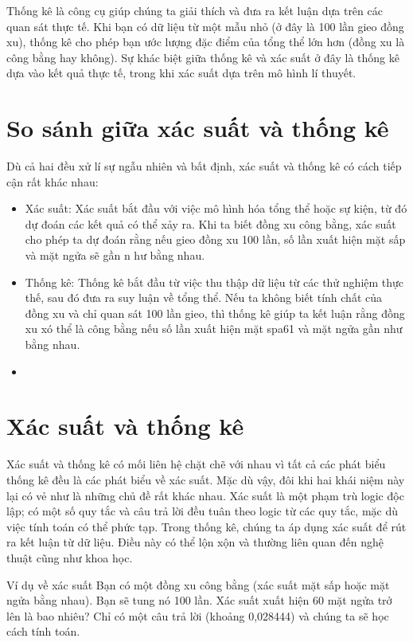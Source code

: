 \documentclass[12pt]{article} %
\begin{document}
Thống kê là công cụ giúp chúng ta giải thích và đưa ra kết luận dựa trên các quan sát thực tế. Khi bạn có dữ liệu từ một mẫu nhỏ (ở đây là 100 lần gieo đồng xu), thống kê cho phép bạn ước lượng đặc điểm của tổng thể lớn hơn (đồng xu là công bằng hay không). Sự khác biệt giữa thống kê và xác suất ở đây là thống kê dựa vào kết quả thực tế, trong khi xác suất dựa trên mô hình lí thuyết.

\section{So sánh giữa xác suất và thống kê}
Dù cả hai đều xử lí sự ngẫu nhiên và bất định, xác suất và thống kê có cách tiếp cận rất khác nhau:
\begin{itemize}
    \item Xác suất: Xác suất bắt đầu với việc mô hình hóa tổng thể hoặc sự kiện, từ đó dự đoán các kết quả có thể xảy ra. Khi ta biết đồng xu công bằng, xác suất cho phép ta dự đoán rằng nếu gieo đồng xu 100 lần, số lần xuất hiện mặt sấp và mặt ngửa sẽ gần n hư bằng nhau.
    \item Thống kê: Thống kê bắt đầu từ việc thu thập dữ liệu từ các thử nghiệm thực thế, sau đó đưa ra suy luận về tổng thể. Nếu ta không biết tính chất của đồng xu và chỉ quan sát 100 lần gieo, thì thống kê giúp ta kết luận rằng đồng xu xó thể là công bằng nếu số lần xuất hiện mặt spa61 và mặt ngửa gần như bằng nhau.
    \item 
\end{itemize}

\section{Xác suất và thống kê}
Xác suất và thống kê có mối liên hệ chặt chẽ với nhau vì tất cả các phát biểu thống kê đều là các phát biểu về xác suất. Mặc dù vậy, đôi khi hai khái niệm này lại có vẻ như là những chủ đề rất khác nhau. Xác suất là một phạm trù logic độc lập; có một số quy tắc và câu trả lời đều tuân theo logic từ các quy tắc, mặc dù việc tính toán có thể phức tạp. Trong thống kê, chúng ta áp dụng xác suất để rút ra kết luận từ dữ liệu. Điều này có thể lộn xộn và thường liên quan đến nghệ thuật cũng như khoa học.

Ví dụ về xác suất
Bạn có một đồng xu công bằng (xác suất mặt sấp hoặc mặt ngửa bằng nhau). Bạn sẽ tung nó 100 lần. Xác suất xuất hiện 60 mặt ngửa trở lên là bao nhiêu? Chỉ có một câu trả lời (khoảng 0,028444) và chúng ta sẽ học cách tính toán.
\end{document}
